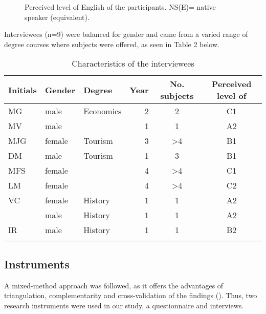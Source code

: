 \documentclass[output=paper]{langsci/langscibook}
\begin{document}
\begin{figure}
\caption{Perceived level of English of the participants. NS(E)= native speaker (equivalent).} 
\label{fig:moratinos:1}
\end{figure}


   
 



Interviewees (n=9) were balanced for gender and came from a varied range of degree courses where  subjects were offered, as seen in Table 2 below. 


\begin{table}
\caption{Characteristics of the interviewees}
\label{tab:moratinos:2}

\begin{tabularx}{\textwidth}{lllrSS}
\lsptoprule
 Initials & Gender & Degree & Year & No.  subjects & Perceived level of \\
 \midrule
 MG & male & Economics & 2 & 2 & C1\\
 MV & male &  & 1 & 1 & A2\\
 MJG & female & Tourism & 3 & >4 & B1\\
 DM & male & Tourism & 1 & 3 & B1\\
 MFS & female &  & 4 & >4 & C1\\
 LM & female &  & 4 & >4 & C2\\
 VC & female & History & 1 & 1 & A2\\
  & male & History & 1 & 1 & A2\\
 IR & male & History & 1 & 1 & B2\\
\lspbottomrule
\end{tabularx}
\end{table}

\subsection{Instruments}

A mixed-method approach was followed, as it offers the advantages of triangulation, complementarity and cross-validation of the findings (\citealt{IvankovaGreer2015}). Thus, two research instruments were used in our study, a questionnaire and interviews. 
\end{document}
